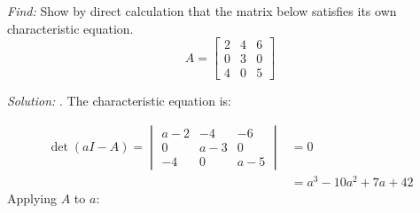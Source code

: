 \documentclass[11pt]{homework}
\begin{document}
\question
\emph{Find:}
\newline
Show by direct calculation that the matrix below 
satisfies its own characteristic equation.
\begin{equation*}
A = 
  \begin{bmatrix}
  2 & 4 & 6 \\
  0 & 3 & 0 \\
  4 & 0 & 5
  \end{bmatrix}
\end{equation*}

\emph{Solution:}
. The characteristic equation is:

\begin{align*}
\det(a I - A) =
  \begin{vmatrix}
  a - 2 & -4 & -6 \\
  0 & a-3 & 0 \\
  -4 & 0 & a-5 
  \end{vmatrix}
  &= 0 \\
  &= a^3 -10 a^2 + 7 a + 42
\end{align*}
Applying $A$ to $a$:
\end{document}
